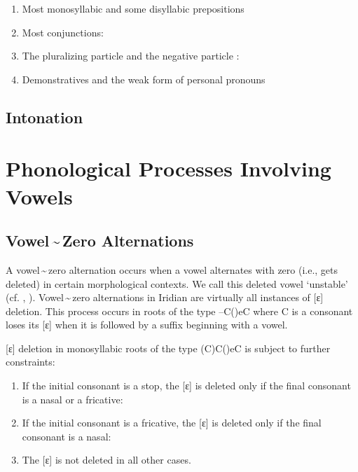 \begin{enumerate}[noitemsep,label=(\alph*)]
	\item Most monosyllabic and some disyllabic prepositions
	\item Most conjunctions:
	\item The pluralizing particle  and the negative particle
	: 
	\item Demonstratives and the weak form of personal pronouns
\end{enumerate}

\subsection{Intonation}

\section{Phonological Processes Involving Vowels}

\subsection{Vowel\,\sim\,Zero Alternations}

A vowel\,\sim\,zero alternation occurs when a vowel alternates with zero (i.e.,
gets deleted) in certain morphological contexts. We call this deleted vowel
`unstable' (cf. \cite{siptar2000}, \cite{gussmann2007}). Vowel\,\sim\,zero
alternations in Iridian are virtually all instances of [ɛ] deletion. This
process occurs in roots of the type --C()eC where C is a consonant loses
its [ɛ] when it is followed by a suffix beginning with a vowel.

\ex
{}
\xe

[ɛ] deletion in monosyllabic roots of the type (C)C()eC is subject to
further constraints:

\begin{enumerate}
	\item If the initial consonant is a stop, the [ɛ] is deleted only if the final consonant is a nasal or a fricative:\\

	\item If the initial consonant is a fricative, the [ɛ] is deleted only if the final consonant is a nasal:\\

	\item The [ɛ] is not deleted in all other cases.
\end{enumerate}

